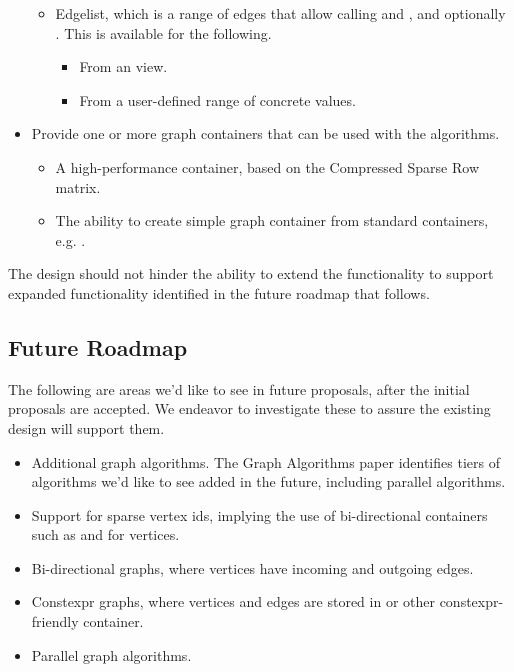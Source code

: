 \begin{itemize}
\begin{itemize}
                  \item Edgelist, which is a range of edges that allow calling  and , and
                        optionally . This is available for the following.
                        \begin{itemize}
                              \item From an  view.
                              \item From a user-defined range of concrete values.
                        \end{itemize}
            \end{itemize}
      \item Provide one or more graph containers that can be used with the algorithms.
            \begin{itemize}
                  \item A high-performance  container, based on the Compressed Sparse Row matrix.
                  \item The ability to create simple graph container from standard containers, e.g. .
            \end{itemize}
\end{itemize}

The design should not hinder the ability to extend the functionality to support expanded functionality identified in the future roadmap
that follows.

\subsection{Future Roadmap}

The following are areas we'd like to see in future proposals, after the initial proposals are accepted. We endeavor to investigate
these to assure the existing design will support them.
\begin{itemize}
      \item Additional graph algorithms. The Graph Algorithms paper identifies tiers of algorithms we'd like to see added in the future, 
            including parallel algorithms.
      \item Support for sparse vertex ids, implying the use of bi-directional containers such as  and  for vertices.
      \item Bi-directional graphs, where vertices have incoming and outgoing edges.
      \item Constexpr graphs, where vertices and edges are stored in  or other constexpr-friendly container.
      \item Parallel graph algorithms.
\end{itemize}


